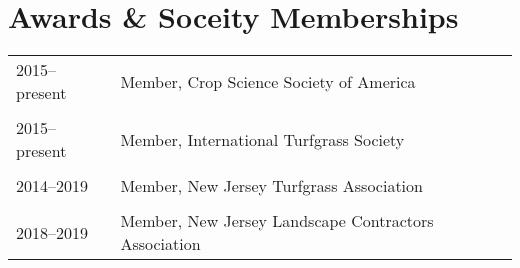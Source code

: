 \documentclass[letterpaper,11pt, english]{article}
\begin{document}
\section{Awards \& Soceity Memberships}

\begin{flushleft}
\begin{tabularx}{\textwidth}{@{}lX@{}}
    2015--present \hspace{3.2cm} & Member, Crop Science Society of America \\
    \\[-0.2cm] 
    2015--present \hspace{3.2cm} & Member, International Turfgrass Society \\
    \\[-0.2cm] 
    2014--2019 \hspace{3.2cm} & Member, New Jersey Turfgrass Association \\
    \\[-0.2cm] 
    2018--2019 \hspace{3.2cm} & Member, New Jersey Landscape Contractors Association \\
\end{tabularx}
\end{flushleft}
\end{document}
